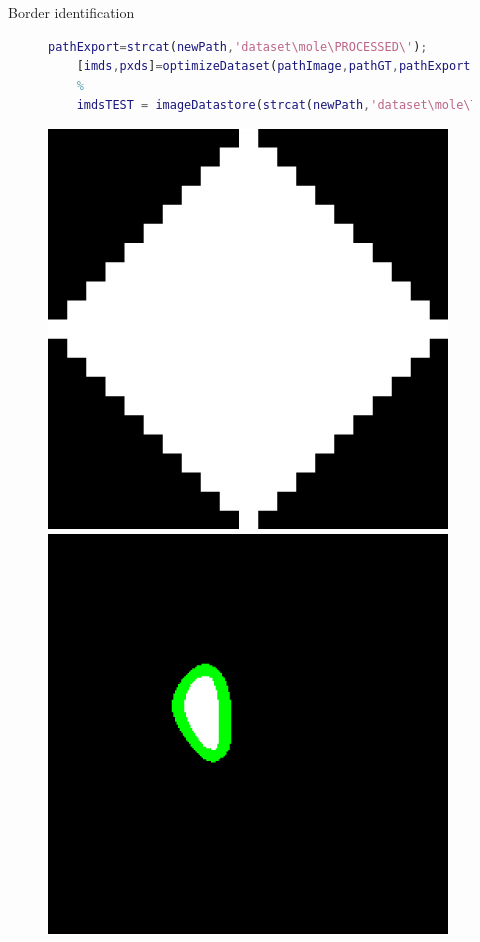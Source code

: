 \documentclass[aspectratio=169,xcolor=dvipsnames]{beamer}
\begin{document}
\begin{frame}[fragile]{Border identification}
\begin{figure}
\begin{minipage}{\linewidth}
{\begin{lstlisting}[language=Matlab,basicstyle=\tiny]
	pathExport=strcat(newPath,'dataset\mole\PROCESSED\');
	[imds,pxds]=optimizeDataset(pathImage,pathGT,pathExport,8,imageSize);
	%
	imdsTEST = imageDatastore(strcat(newPath,'dataset\mole\TEST\Immagini')); 
	\end{lstlisting}}
\end{minipage}\hfill
\begin{minipage}{0.1\linewidth}
	\centering
\includegraphics[width=\linewidth]{element.pdf}
\end{minipage}\hfill
\begin{minipage}{0.2\linewidth}
	\centering
	\includegraphics[width=0.9\linewidth]{eroded.pdf}

\end{minipage}
\end{figure}
\end{frame}
\end{document}

